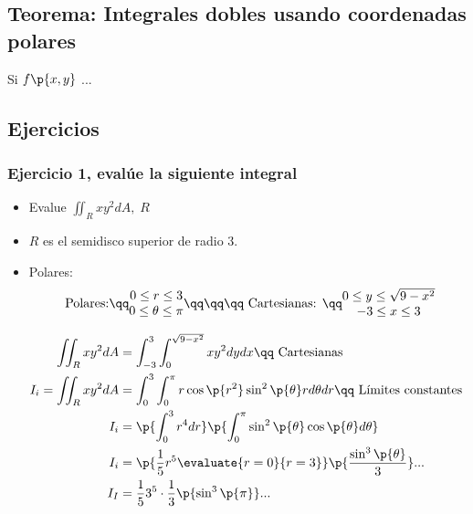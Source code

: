 \subsection*{Teorema: Integrales dobles usando coordenadas polares }
Si $\displaystyle f\p{x,y} $ ... 

\subsection{Ejercicios}
\subsubsection*{Ejercicio 1, evalúe la siguiente integral}
\begin{itemize}
    \item Evalue $\displaystyle \iint_{R}^{}xy^2 dA,\; R$ 
    \item $\displaystyle R$ es el semidisco superior de radio $3$.
        \begin{figure}[!htb]
            \centering
        \end{figure}
    
    \item Polares: 
        \[
            \text{ Polares:} \qq 
          \begin{matrix}
              0 \leq r \leq 3 \\ 
              0 \leq \theta \leq \pi \\ 
          \end{matrix} \qq \qq \qq 
          \text{ Cartesianas:  }\qq 
          \begin{matrix}
              0 \leq y \leq \sqrt{9-x^2} \\ 
              -3 \leq x \leq 3 \\ 
          \end{matrix}
        \]
        \begin{center}
           \begin{align*}
               \iint_{R}^{}xy^2 dA &= \int_{-3}^{3} \int_{0}^{\sqrt{9-x^2}}xy^2 dy dx \qq \text{ Cartesianas } \\ 
                I_i = \iint_{R}^{} xy^2dA &= \int_{0}^{3}\int_{0}^{\pi}r \cos\p{ r^2 } \sin^2\p{ \theta } r d\theta dr  \qq \text{ Límites constantes } \\ 
                I_i &= \p{\int_{0}^{3}r^4dr} \p{\int_{0}^{\pi}\sin^2\p{ \theta } \cos\p{ \theta } d\theta} \\ 
                I_i &= \p{\frac{1}{5} r^5 \evaluate{r=0}{r=3} } \p{\frac{\sin^3\p{ \theta  } }{3} } ... \\ 
                I_I &= \frac{1}{5} 3^5 \cdot \frac{1}{3} \p{ \sin^3\p{ \pi }  } ... \\ 
           \end{align*}
        \end{center}
\end{itemize}
 
